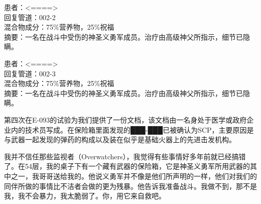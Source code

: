 \begin{scpbox}
\hr

患者：<====>\\
回复管道：002-2\\
混合物成分：75\%营养物，25\%祝福\\
摘要：一名在战斗中受伤的神圣义勇军成员。治疗由高级神父所指示，细节已隐瞒。

\hr

患者：<====>\\
回复管道：002-3\\
混合物成分：75\%营养物，25\%祝福\\
摘要：一名在战斗中受伤的神圣义勇军成员。治疗由高级神父所指示，细节已隐瞒。

\end{scpbox}

\begin{scpdialog}
\end{scpdialog}

第四次在E-093的试验为我们提供了一份文档，该文档由一名身处于医学或政府企业内的技术员写成。在保险箱里面发现的███-███已被确认为SCP，主要原因是与武器一起发现的弹药的构成以及装在似乎是基础火器上的先进击发机构。


\begin{scpbox}

我并不信任那些监视者（Overwatchers），我觉得有些事情好多年前就已经搞错了。在54层，我的桌子下有一个藏有武器的保险箱，它是神圣义勇军所用武器的其中之一，我哥哥送给我的。他说义勇军并不像是他们所声明的一样，他们对我们的同伴所做的事情比不洁者会做的更为残暴。他告诉我准备战斗。我做不到，那不是我，我不会暴力，我太脆弱了。你，用它来自救吧。

\end{scpbox}


